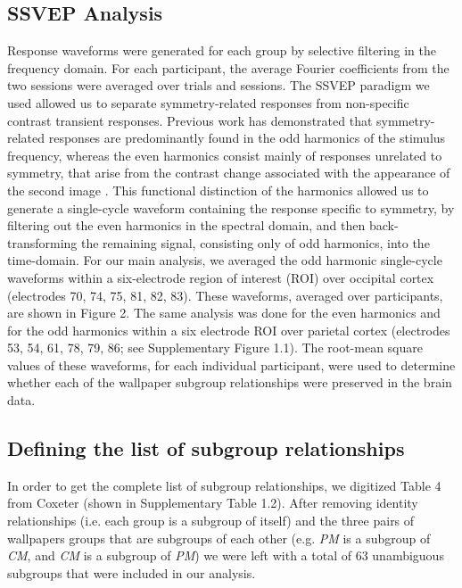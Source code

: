 \documentclass[11pt, twoside]{article}
\begin{document}
\subsection*{SSVEP Analysis}
Response waveforms were generated for each group by selective filtering in the frequency domain. For each participant, the average Fourier coefficients from the two sessions were averaged over trials and sessions. The SSVEP paradigm we used allowed us to separate symmetry-related responses from non-specific contrast transient responses. Previous work has demonstrated that symmetry-related responses are predominantly found in the odd harmonics of the stimulus frequency, whereas the even harmonics consist mainly of responses unrelated to symmetry, that arise from the contrast change associated with the appearance of the second image \citep{RN1954, RN1725}. This functional distinction of the harmonics allowed us to generate a single-cycle waveform containing the response specific to symmetry, by filtering out the even harmonics in the spectral domain, and then back-transforming the remaining signal, consisting only of odd harmonics, into the time-domain. For our main analysis, we averaged the odd harmonic single-cycle waveforms within a six-electrode region of interest (ROI) over occipital cortex (electrodes 70, 74, 75, 81, 82, 83). These waveforms, averaged over participants, are shown in Figure 2. The same analysis was done for the even harmonics and for the odd harmonics within a six electrode ROI over parietal cortex (electrodes 53, 54, 61, 78, 79, 86; see Supplementary Figure 1.1). The root-mean square values of these waveforms, for each individual participant, were used to determine whether each of the wallpaper subgroup relationships were preserved in the brain data.  

\subsection*{Defining the list of subgroup relationships}
In order to get the complete list of subgroup relationships, we digitized Table 4 from Coxeter \citep{RN1711} (shown in Supplementary Table 1.2). After removing identity relationships (i.e. each group is a subgroup of itself) and the three pairs of wallpapers groups that are subgroups of each other (e.g. \textit{PM} is a subgroup of \textit{CM}, and \textit{CM} is a subgroup of \textit{PM}) we were left with a total of 63 unambiguous subgroups that were included in our analysis. 
\end{document}
